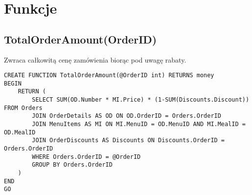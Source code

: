 \section{Funkcje}
\subsection{TotalOrderAmount(OrderID)}
Zwraca całkowitą cenę zamówienia biorąc pod uwagę rabaty.
\begin{verbatim}
CREATE FUNCTION TotalOrderAmount(@OrderID int) RETURNS money
BEGIN
    RETURN (
        SELECT SUM(OD.Number * MI.Price) * (1-SUM(Discounts.Discount)) FROM Orders
        JOIN OrderDetails AS OD ON OD.OrderID = Orders.OrderID
        JOIN MenuItems AS MI ON MI.MenuID = OD.MenuID AND MI.MealID = OD.MealID
        JOIN OrderDiscounts AS Discounts ON Discounts.OrderID = Orders.OrderID
        WHERE Orders.OrderID = @OrderID
        GROUP BY Orders.OrderID
    )
END
GO
\end{verbatim}
